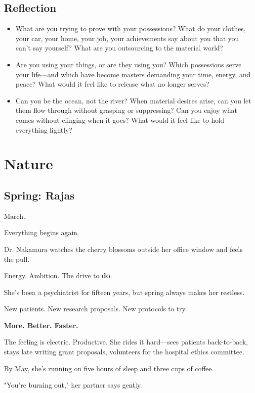 \documentclass[11pt,twoside]{book}
\begin{document}
\section*{Reflection}

\begin{itemize}
\item What are you trying to prove with your possessions? What do your clothes, your car, your home, your job, your achievements say about you that you can't say yourself? What are you outsourcing to the material world?
\item Are you using your things, or are they using you? Which possessions serve your life—and which have become masters demanding your time, energy, and peace? What would it feel like to release what no longer serves?
\item Can you be the ocean, not the river? When material desires arise, can you let them flow through without grasping or suppressing? Can you enjoy what comes without clinging when it goes? What would it feel like to hold everything lightly?
\end{itemize}

\chapter{Nature}

\section*{Spring: Rajas}

March.

Everything begins again.

Dr. Nakamura watches the cherry blossoms outside her office window and feels the pull.

Energy. Ambition. The drive to \textbf{do}.

She's been a psychiatrist for fifteen years, but spring always makes her restless.

New patients. New research proposals. New protocols to try.

\textbf{More. Better. Faster.}

The feeling is electric. Productive. She rides it hard—sees patients back-to-back, stays late writing grant proposals, volunteers for the hospital ethics committee.

By May, she's running on five hours of sleep and three cups of coffee.

"You're burning out," her partner says gently.
\end{document}
